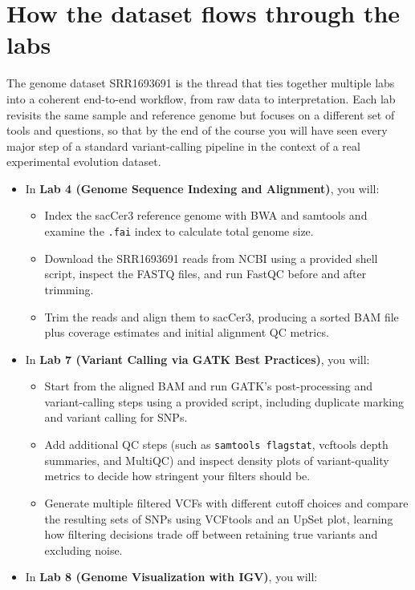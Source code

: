 \documentclass[
  letterpaper,
  DIV=11,
  numbers=noendperiod]{scrreprt}
\providecommand{\tightlist}{%
  \setlength{\itemsep}{0pt}\setlength{\parskip}{0pt}}
\begin{document}
\section{How the dataset flows through the
labs}\label{how-the-dataset-flows-through-the-labs}

The genome dataset SRR1693691 is the thread that ties together multiple
labs into a coherent end-to-end workflow, from raw data to
interpretation. Each lab revisits the same sample and reference genome
but focuses on a different set of tools and questions, so that by the
end of the course you will have seen every major step of a standard
variant-calling pipeline in the context of a real experimental evolution
dataset.

\begin{itemize}
\tightlist
\item
  In \textbf{Lab 4 (Genome Sequence Indexing and Alignment)}, you will:

  \begin{itemize}
  \tightlist
  \item
    Index the sacCer3 reference genome with BWA and samtools and examine
    the \texttt{.fai} index to calculate total genome size.\\
  \item
    Download the SRR1693691 reads from NCBI using a provided shell
    script, inspect the FASTQ files, and run FastQC before and after
    trimming.\\
  \item
    Trim the reads and align them to sacCer3, producing a sorted BAM
    file plus coverage estimates and initial alignment QC metrics.
  \end{itemize}
\item
  In \textbf{Lab 7 (Variant Calling via GATK Best Practices)}, you will:

  \begin{itemize}
  \tightlist
  \item
    Start from the aligned BAM and run GATK's post-processing and
    variant-calling steps using a provided script, including duplicate
    marking and variant calling for SNPs.\\
  \item
    Add additional QC steps (such as \texttt{samtools\ flagstat},
    vcftools depth summaries, and MultiQC) and inspect density plots of
    variant-quality metrics to decide how stringent your filters should
    be.
  \item
    Generate multiple filtered VCFs with different cutoff choices and
    compare the resulting sets of SNPs using VCFtools and an UpSet plot,
    learning how filtering decisions trade off between retaining true
    variants and excluding noise.
  \end{itemize}
\item
  In \textbf{Lab 8 (Genome Visualization with IGV)}, you will:


\end{itemize}
\end{document}

